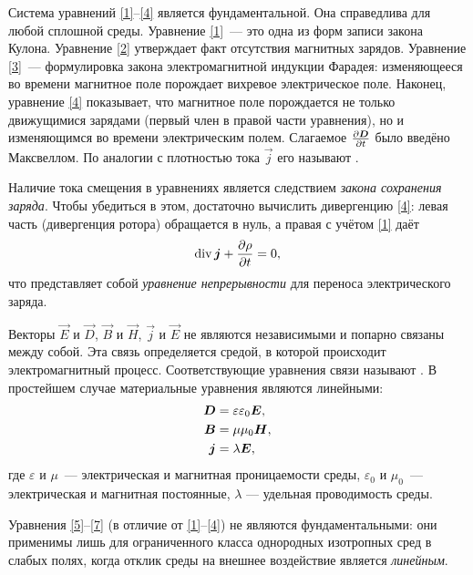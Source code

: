 Система уравнений \eqref{1}--\eqref{4} является фундаментальной. Она справедлива
для любой сплошной среды. Уравнение \eqref{1}~--- это одна из форм записи закона Кулона. 
Уравнение \eqref{2} утверждает факт отсутствия магнитных зарядов.
Уравнение \eqref{3}~--- формулировка закона электромагнитной индукции Фарадея: 
изменяющееся во времени магнитное поле порождает вихревое электрическое поле.
Наконец, уравнение \eqref{4} показывает, что магнитное поле порождается не только 
движущимися зарядами (первый член в правой части уравнения), но и изменяющимся 
во времени электрическим полем. Слагаемое $\frac{\partial {\boldsymbol{D}}}{\partial t}$ было введёно Максвеллом.
По аналогии с плотностью тока $\vec{j}$ его называют .

\begin{lab:note}
Наличие тока смещения в уравнениях является следствием \emph{закона сохранения заряда}.
Чтобы убедиться в этом, достаточно вычислить дивергенцию \eqref{4}:
левая часть (дивергенция ротора) обращается в нуль, а правая с учётом 
\eqref{1} даёт
\begin{equation}
\eqmark{cont}
\Div \vec{j} + \ddt{\rho} = 0,
\end{equation}
что представляет собой \emph{уравнение непрерывности} для переноса электрического заряда.
\end{lab:note}
 
Векторы $\vec{E}$ и $\vec{D}$, $\vec{B}$ и $\vec{H}$, $\vec{j}$ и $\vec{E}$ 
не являются независимыми и попарно связаны между собой. Эта связь определяется средой, 
в которой происходит электромагнитный процесс. 
Соответствующие уравнения связи называют .
В простейшем случае материальные уравнения являются линейными:
\begin{align}
\eqmark{5}
\vec{D}&=\varepsilon\varepsilon_0\vec{E},\\
\eqmark{6}
\vec{B}&=\mu\mu_0\vec{H},\\
\eqmark{7}
\vec{j}&=\lambda\vec{E},
\end{align}
где $\varepsilon$ и $\mu$~--- электрическая и магнитная проницаемости среды,
$\varepsilon_0$ и $\mu_0$~--- электрическая и магнитная постоянные,
$\lambda$ --- удельная проводимость среды.
\begin{lab:note}
Уравнения \eqref{5}--\eqref{7} (в отличие от \eqref{1}--\eqref{4})
не являются фундаментальными: они применимы лишь для ограниченного класса 
однородных изотропных сред в слабых полях, когда отклик среды на внешнее
воздействие является \emph{линейным}.
\end{lab:note}

